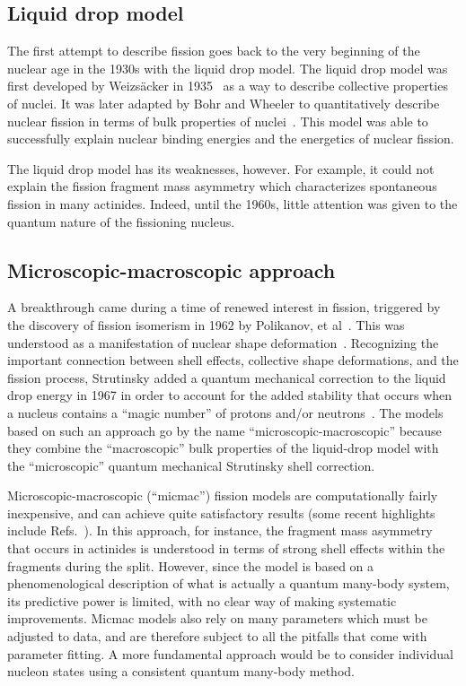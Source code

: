 \subsection{Liquid drop model}
The first attempt to describe fission goes back to the very beginning of the nuclear age in the 1930s with the liquid drop model. The liquid drop model was first developed by Weizs\"acker in 1935~\cite{Weizsacker1935} as a way to describe collective properties of nuclei. It was later adapted by Bohr and Wheeler to quantitatively describe nuclear fission in terms of bulk properties of nuclei~\cite{Bohr1939}. This model was able to successfully explain nuclear binding energies and the energetics of nuclear fission.

The liquid drop model has its weaknesses, however. For example, it could not explain the fission fragment mass asymmetry which characterizes spontaneous fission in many actinides. Indeed, until the 1960s, little attention was given to the quantum nature of the fissioning nucleus.%

\subsection{Microscopic-macroscopic approach}
A breakthrough came during a time of renewed interest in fission, triggered by the discovery of fission isomerism in 1962 by Polikanov, et al~\cite{Polikanov1962}. This was understood as a manifestation of nuclear shape deformation~\cite{Hill1953,Nilsson1955}. Recognizing the important connection between shell effects, collective shape deformations, and the fission process, Strutinsky added a quantum mechanical correction to the liquid drop energy in 1967 in order to account for the added stability that occurs when a nucleus contains a ``magic number'' of protons and/or neutrons~\cite{Strutinsky1967, Strutinsky1968, Brack1972}. The models based on such an approach go by the name ``microscopic-macroscopic'' because they combine the ``macroscopic'' bulk properties of the liquid-drop model with the ``microscopic'' quantum mechanical Strutinsky shell correction.

Microscopic-macroscopic (``micmac'') fission models are computationally fairly inexpensive, and can achieve quite satisfactory results (some recent highlights include Refs.~\cite{Krappe2012,Moller2015a,Moller2015b,Jachimowicz2013,Jachimowicz2017}). In this approach, for instance, the fragment mass asymmetry that occurs in actinides is understood in terms of strong shell effects within the fragments during the split. However, since the model is based on a phenomenological description of what is actually a quantum many-body system, its predictive power is limited, with no clear way of making systematic improvements. Micmac models also rely on many parameters which must be adjusted to data, and are therefore subject to all the pitfalls that come with parameter fitting. A more fundamental approach would be to consider individual nucleon states using a consistent quantum many-body method. 

